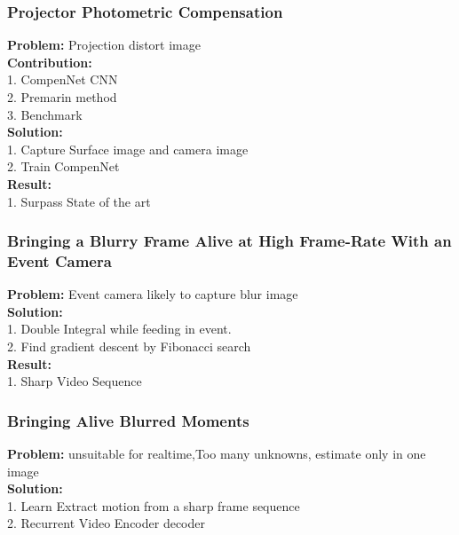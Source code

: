 \subsubsection{Projector Photometric Compensation}
    {\bf Problem:} Projection distort image \\
    {\bf Contribution:} \\
        1. CompenNet CNN \\
        2. Premarin method \\
        3. Benchmark \\
    {\bf Solution:} \\
        1. Capture Surface image and camera image \\
        2. Train CompenNet \\
    {\bf Result:} \\
        1. Surpass State of the art \\
\subsubsection{Bringing a Blurry Frame Alive at High Frame-Rate With an Event Camera}
    {\bf Problem:} Event camera likely to capture blur image \\
    {\bf Solution:}  \\
        1. Double Integral while feeding in event. \\
        2. Find gradient descent by Fibonacci search \\
    {\bf Result:} \\
        1. Sharp Video Sequence \\
\subsubsection{Bringing Alive Blurred Moments}
    {\bf Problem:} unsuitable for realtime,Too many unknowns, estimate only in one image \\
    {\bf Solution:} \\
        1. Learn Extract motion from a sharp frame sequence \\
        2. Recurrent Video Encoder decoder \\
